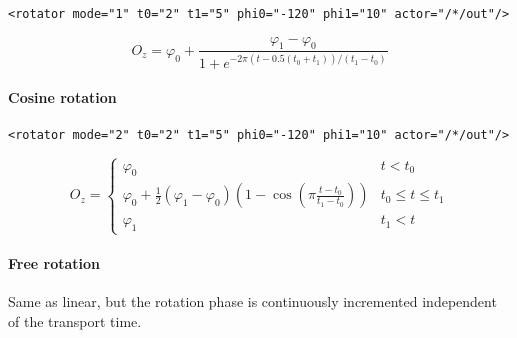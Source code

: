 \begin{lstlisting}[numbers=none]
  <rotator mode="1" t0="2" t1="5" phi0="-120" phi1="10" actor="/*/out"/>
\end{lstlisting}

\begin{equation}
O_z = \varphi_0+\frac{\varphi_1-\varphi_0}{1+e^{-2\pi (t-0.5(t_0+t_1))/(t_1-t_0)}}
\end{equation}

\paragraph{Cosine rotation}

\begin{lstlisting}[numbers=none]
  <rotator mode="2" t0="2" t1="5" phi0="-120" phi1="10" actor="/*/out"/>
\end{lstlisting}

\begin{equation}
O_z = \left\{\begin{array}{ll}
\varphi_0 & t<t_0\\
\varphi_0+\frac12(\varphi_1-\varphi_0)(1-\cos(\pi \frac{t-t_0}{t_1-t_0})) & t_0\le t \le t_1\\
\varphi_1 & t_1 < t
\end{array}\right.
\end{equation}

\paragraph{Free rotation}

Same as linear, but the rotation phase is continuously incremented
independent of the transport time.
